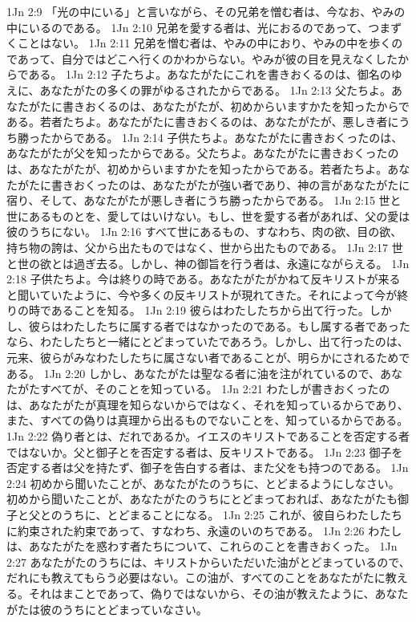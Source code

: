 1Jn 2:9  「光の中にいる」と言いながら、その兄弟を憎む者は、今なお、やみの中にいるのである。
1Jn 2:10  兄弟を愛する者は、光におるのであって、つまずくことはない。
1Jn 2:11  兄弟を憎む者は、やみの中におり、やみの中を歩くのであって、自分ではどこへ行くのかわからない。やみが彼の目を見えなくしたからである。
1Jn 2:12  子たちよ。あなたがたにこれを書きおくるのは、御名のゆえに、あなたがたの多くの罪がゆるされたからである。
1Jn 2:13  父たちよ。あなたがたに書きおくるのは、あなたがたが、初めからいますかたを知ったからである。若者たちよ。あなたがたに書きおくるのは、あなたがたが、悪しき者にうち勝ったからである。
1Jn 2:14  子供たちよ。あなたがたに書きおくったのは、あなたがたが父を知ったからである。父たちよ。あなたがたに書きおくったのは、あなたがたが、初めからいますかたを知ったからである。若者たちよ。あなたがたに書きおくったのは、あなたがたが強い者であり、神の言があなたがたに宿り、そして、あなたがたが悪しき者にうち勝ったからである。
1Jn 2:15  世と世にあるものとを、愛してはいけない。もし、世を愛する者があれば、父の愛は彼のうちにない。
1Jn 2:16  すべて世にあるもの、すなわち、肉の欲、目の欲、持ち物の誇は、父から出たものではなく、世から出たものである。
1Jn 2:17  世と世の欲とは過ぎ去る。しかし、神の御旨を行う者は、永遠にながらえる。
1Jn 2:18  子供たちよ。今は終りの時である。あなたがたがかねて反キリストが来ると聞いていたように、今や多くの反キリストが現れてきた。それによって今が終りの時であることを知る。
1Jn 2:19  彼らはわたしたちから出て行った。しかし、彼らはわたしたちに属する者ではなかったのである。もし属する者であったなら、わたしたちと一緒にとどまっていたであろう。しかし、出て行ったのは、元来、彼らがみなわたしたちに属さない者であることが、明らかにされるためである。
1Jn 2:20  しかし、あなたがたは聖なる者に油を注がれているので、あなたがたすべてが、そのことを知っている。
1Jn 2:21  わたしが書きおくったのは、あなたがたが真理を知らないからではなく、それを知っているからであり、また、すべての偽りは真理から出るものでないことを、知っているからである。
1Jn 2:22  偽り者とは、だれであるか。イエスのキリストであることを否定する者ではないか。父と御子とを否定する者は、反キリストである。
1Jn 2:23  御子を否定する者は父を持たず、御子を告白する者は、また父をも持つのである。
1Jn 2:24  初めから聞いたことが、あなたがたのうちに、とどまるようにしなさい。初めから聞いたことが、あなたがたのうちにとどまっておれば、あなたがたも御子と父とのうちに、とどまることになる。
1Jn 2:25  これが、彼自らわたしたちに約束された約束であって、すなわち、永遠のいのちである。
1Jn 2:26  わたしは、あなたがたを惑わす者たちについて、これらのことを書きおくった。
1Jn 2:27  あなたがたのうちには、キリストからいただいた油がとどまっているので、だれにも教えてもらう必要はない。この油が、すべてのことをあなたがたに教える。それはまことであって、偽りではないから、その油が教えたように、あなたがたは彼のうちにとどまっていなさい。
